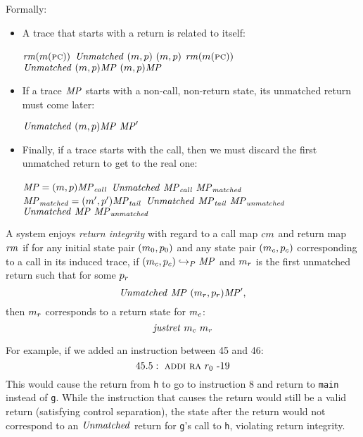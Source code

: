 \documentclass[acmsmall,review,anonymous]{acmart}\settopmatter{printfolios=true,printccs=false,printacmref=false}
\begin{document}
Formally:
\begin{itemize}
\item A trace that starts with a return is related to itself:

  \judgmenttwo{\(\callmap(\mach(\PCname)) = \bot\)}
              {\(\mathit{rm}(m(\textsc{pc}))\)}
              {\(\mathit{Unmatched} ~ (m,p) ~ (m,p)\)}
  \judgmenttwo{\(\callmap(\mach(\PCname)) = \bot\)}
              {\(\mathit{rm}(m(\textsc{pc}))\)}
              {\(\mathit{Unmatched} ~ (m,p)\mathit{MP} ~ (m,p)\mathit{MP}\)}

\item If a trace \(\mathit{MP}\) starts with a non-call, non-return state,
  its unmatched return must come later:

           {\(\mathit{Unmatched} ~ (m,p)\mathit{MP} ~ \mathit{MP}'\)}

\item Finally, if a trace starts with the call, then we must discard the first
  unmatched return to get to the real one:


             {\(\mathit{MP} = (m,p)\mathit{MP}_{\mathit{call}}\) \quad \(\mathit{Unmatched} ~ \mathit{MP}_{\mathit{call}} ~ \mathit{MP}_{\mathit{matched}}\)}
             {\(\mathit{MP}_{\mathit{matched}} = (m',p') \mathit{MP}_{\mathit{tail}}\) \quad
              \(\mathit{Unmatched} ~ \mathit{MP}_{\mathit{tail}} ~ \mathit{MP}_{\mathit{unmatched}}\)}
            {\(\mathit{Unmatched} ~ \mathit{MP} ~ \mathit{MP}_{\mathit{unmatched}}\)}
\end{itemize}
A system enjoys {\em return integrity} with regard to a call map
\(cm\) and return map \(\mathit{rm}\) if for any initial state pair
\((m_0, p_0)\) and any state pair \((m_c, p_c)\)
corresponding to a call in its induced trace, if
\((m_c,p_c) \hookrightarrow_P \mathit{MP}\) and \(m_r\)
is the first unmatched return such that for some $p_r$
\[ \mathit{Unmatched} ~ \mathit{MP} ~ (m_r,p_r)\mathit{MP}',\]
then $m_r$ corresponds to a return state for $m_c$:
\[\mathit{justret}\ m_c\ m_r\]

For example, if we added an instruction between 45 and 46:
\[
45.5: ~ \textsc{addi} ~ \textsc{ra} ~ r_0 ~ \textrm{-} 19
\]
This would cause the return from {\tt h} to go to instruction 8 and
return to {\tt main} instead of {\tt g}. While the instruction that
causes the return would still be a valid return (satisfying control
separation), the state after the return would not correspond to an
$\mathit{Unmatched}$ return for {\tt g}'s call to {\tt h}, violating return
integrity.
\end{document}
